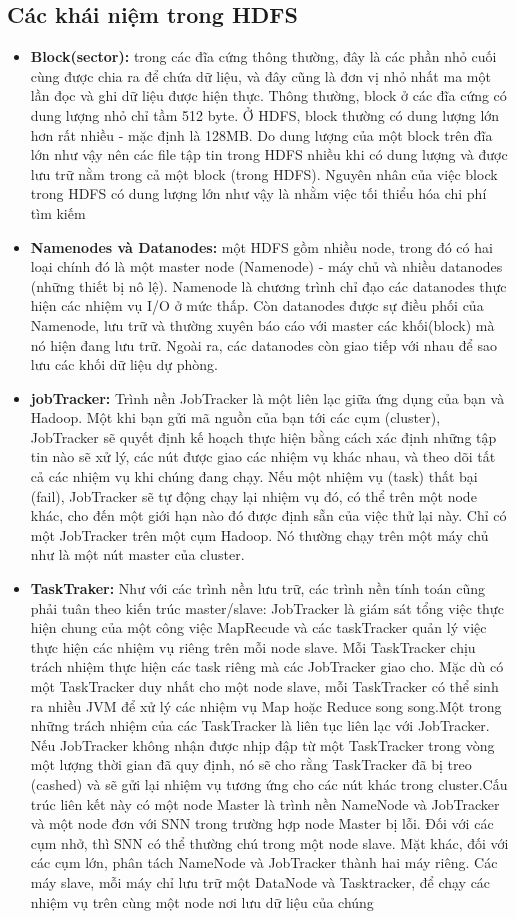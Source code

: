 \subsection{Các khái niệm trong HDFS}
\begin{itemize}
	\item \textbf{Block(sector): }trong các đĩa cứng thông thường, đây là các phần nhỏ cuối cùng được chia ra để chứa dữ liệu, và đây cũng là đơn vị nhỏ nhất ma một lần đọc và ghi dữ liệu được hiện thực. Thông thường, block ở các đĩa cứng có dung lượng nhỏ chỉ tầm 512 byte. Ở HDFS, block thường có dung lượng lớn hơn rất nhiều - mặc định là 128MB. Do dung lượng của một block trên đĩa lớn như vậy nên các file tập tin trong HDFS nhiều khi có dung lượng và được lưu trữ nằm trong cả một block (trong HDFS). Nguyên nhân của việc block trong HDFS có dung lượng lớn như vậy là nhằm việc tối thiểu hóa chi phí tìm kiếm \cite{hadoop-def}
	\item \textbf{Namenodes và Datanodes: }một HDFS gồm nhiều node, trong đó có hai loại chính đó là một master node (Namenode) - máy chủ và nhiều datanodes (những thiết bị nô lệ). Namenode là chương trình chỉ đạo các datanodes thực hiện các nhiệm vụ I/O ở mức thấp. Còn datanodes được sự điều phối của Namenode, lưu trữ và thường xuyên báo cáo với master các khối(block) mà nó hiện đang lưu trữ. Ngoài ra, các datanodes còn giao tiếp với nhau để sao lưu các khối dữ liệu dự phòng.
	\item \textbf{jobTracker: }Trình nền JobTracker là một liên lạc giữa ứng dụng của bạn và Hadoop. Một khi bạn gửi mã nguồn của bạn tới các cụm (cluster), JobTracker sẽ quyết định kế hoạch thực hiện bằng cách xác định những tập tin nào sẽ xử lý, các nút được giao các nhiệm vụ khác nhau, và theo dõi tất cả các nhiệm vụ khi chúng đang chạy. Nếu một nhiệm vụ (task) thất bại (fail), JobTracker sẽ tự động chạy lại nhiệm vụ đó, có thể trên một node khác, cho đến một giới hạn nào đó được định sẵn của việc thử lại này.
Chỉ có một JobTracker trên một cụm Hadoop. Nó thường chạy trên một máy chủ như là một nút master của cluster.
\item \textbf{TaskTraker: }Như với các trình nền lưu trữ, các trình nền tính toán cũng phải tuân theo kiến trúc master/slave: JobTracker là giám sát tổng việc thực hiện chung của một công việc MapRecude và các taskTracker quản lý việc thực hiện các nhiệm vụ riêng trên mỗi node slave.
Mỗi TaskTracker chịu trách nhiệm thực hiện các task riêng mà các JobTracker giao cho. Mặc dù có một TaskTracker duy nhất cho một node slave, mỗi TaskTracker có thể sinh ra nhiều JVM để xử lý các nhiệm vụ Map hoặc Reduce song song.Một trong những trách nhiệm của các TaskTracker là liên tục liên lạc với JobTracker. Nếu JobTracker không nhận được nhịp đập từ một TaskTracker trong vòng một lượng thời gian đã quy định, nó sẽ cho rằng TaskTracker đã bị treo (cashed) và sẽ gửi lại nhiệm vụ tương ứng cho các nút khác trong cluster.Cấu trúc liên kết này có một node Master là trình nền NameNode và JobTracker và một node đơn với SNN trong trường hợp node Master bị lỗi. Đối với các cụm nhở, thì SNN có thể thường chú trong một node slave. Mặt khác, đối với các cụm lớn, phân tách NameNode và JobTracker thành hai máy riêng. Các máy slave, mỗi máy chỉ lưu trữ một DataNode và Tasktracker, để chạy các nhiệm vụ trên cùng một node nơi lưu dữ liệu của chúng

\end{itemize}
